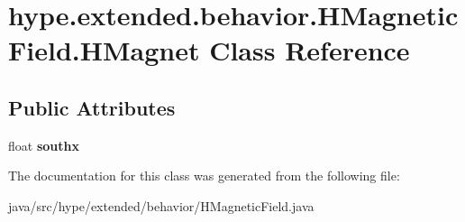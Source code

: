 \hypertarget{classhype_1_1extended_1_1behavior_1_1_h_magnetic_field_1_1_h_magnet}{\section{hype.\-extended.\-behavior.\-H\-Magnetic\-Field.\-H\-Magnet Class Reference}
\label{classhype_1_1extended_1_1behavior_1_1_h_magnetic_field_1_1_h_magnet}
}
\subsection*{Public Attributes}
\begin{DoxyCompactItemize}
\item 
\hypertarget{classhype_1_1extended_1_1behavior_1_1_h_magnetic_field_1_1_h_magnet_a2662a8d81bc63c7b4ee51716f3dc2e77}{float {\bfseries southx}}\label{classhype_1_1extended_1_1behavior_1_1_h_magnetic_field_1_1_h_magnet_a2662a8d81bc63c7b4ee51716f3dc2e77}

\end{DoxyCompactItemize}


The documentation for this class was generated from the following file\-:\begin{DoxyCompactItemize}
\item 
java/src/hype/extended/behavior/H\-Magnetic\-Field.\-java\end{DoxyCompactItemize}
